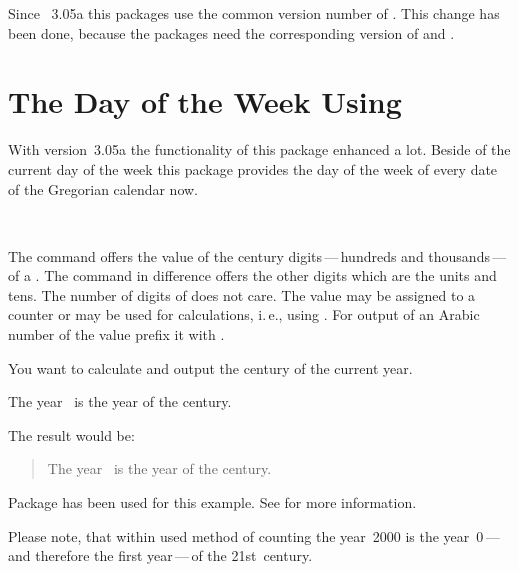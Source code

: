 Since
\KOMAScript~3.05a
this packages use the common version number of \KOMAScript. This change has
been done, because the packages need the corresponding version of
 and .


\section{The Day of the Week Using
  }
\label{sec:datetime.scrdate}

With version~3.05a the functionality of this package enhanced a lot. Beside of
the current day of the week this package provides the
day of the week of every date of the Gregorian calendar now.

\begin{Declaration}
  \\%
\end{Declaration}%
%
%
The command  offers
the value of the century digits\,---\,hundreds and thousands\,---\,of a
. The command  in difference offers the other
digits which are the units and tens. The number of digits of 
does not care. The value may be assigned to a counter or may be used for
calculations, i.\,e., using . For output of
an Arabic number of the value prefix it with .

\begin{Example}
  You want to calculate and output the century of the current year.
\begin{lstcode}
  The year \the\year\ is the year \the\DecadePart{\year}
  of the \engord{\numexpr\CenturyPart{\year}+1\relax} century.
\end{lstcode}
  The result would be:
  \begin{quote}
    The year \the\year\ is the year \the\DecadePart{\year}
    of the \engordnumber{\numexpr\CenturyPart{\year}+1\relax} century.
  \end{quote}
  Package  has been used for this
  example. See \cite{package:engord} for more information.
\end{Example}

Please note, that within used method of counting the
year~2000 is the year~0\,---\,and therefore the first year\,---\,of the
21st~century.%
%
%

